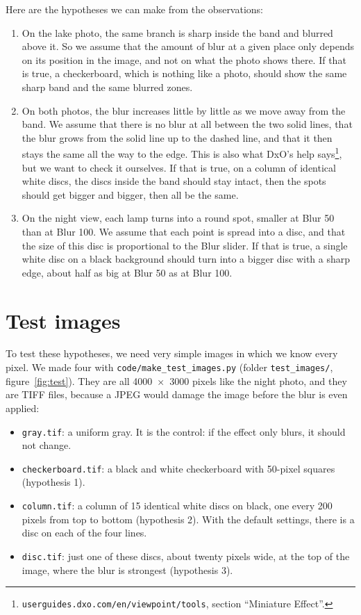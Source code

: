 \documentclass[10pt,a4paper]{article}
\begin{document}
Here are the hypotheses we can make from the observations:
\begin{enumerate}
  \item On the lake photo, the same branch is sharp inside the band and blurred above it. So we assume that the amount of blur at a given place only depends on its position in the image, and not on what the photo shows there. If that is true, a checkerboard, which is nothing like a photo, should show the same sharp band and the same blurred zones.

  \item On both photos, the blur increases little by little as we move away from the band. We assume that there is no blur at all between the two solid lines, that the blur grows from the solid line up to the dashed line, and that it then stays the same all the way to the edge. This is also what DxO's help says\footnote{\texttt{userguides.dxo.com/en/viewpoint/tools}, section ``Miniature Effect''.}, but we want to check it ourselves. If that is true, on a column of identical white discs, the discs inside the band should stay intact, then the spots should get bigger and bigger, then all be the same.

  \item On the night view, each lamp turns into a round spot, smaller at Blur 50 than at Blur 100. We assume that each point is spread into a disc, and that the size of this disc is proportional to the Blur slider. If that is true, a single white disc on a black background should turn into a bigger disc with a sharp edge, about half as big at Blur 50 as at Blur 100.
\end{enumerate}

\section*{Test images}

To test these hypotheses, we need very simple images in which we know every pixel. We made four with \texttt{code/make\_test\_images.py} (folder \texttt{test\_images/}, figure~\ref{fig:test}). They are all 4000~×~3000 pixels like the night photo, and they are TIFF files, because a JPEG would damage the image before the blur is even applied:

\begin{itemize}
  \item \texttt{gray.tif}: a uniform gray. It is the control: if the effect only blurs, it should not change.
  \item \texttt{checkerboard.tif}: a black and white checkerboard with 50-pixel squares (hypothesis 1).
  \item \texttt{column.tif}: a column of 15 identical white discs on black, one every 200 pixels from top to bottom (hypothesis 2). With the default settings, there is a disc on each of the four lines.
  \item \texttt{disc.tif}: just one of these discs, about twenty pixels wide, at the top of the image, where the blur is strongest (hypothesis 3).
\end{itemize}
\end{document}
